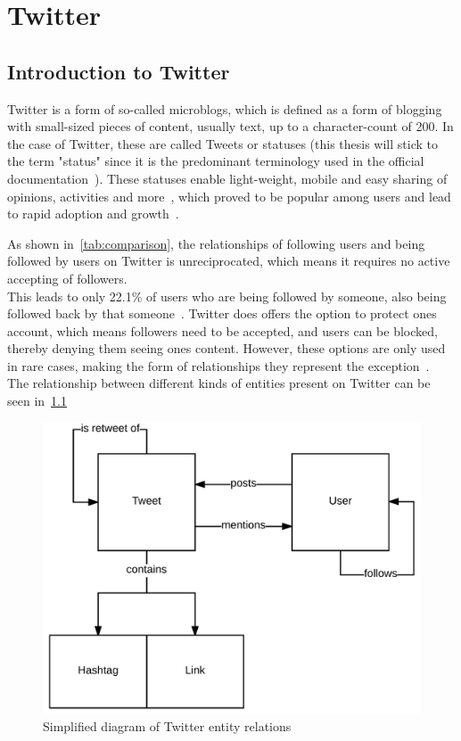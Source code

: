 \chapter{Twitter}
\label{ch:twitter}

\section{Introduction to Twitter}
\label{sec:twitter}

Twitter is a form of so-called microblogs, which is defined as a form of blogging with small-sized pieces of content,
usually text, up to a character-count of 200.
In the case of Twitter, these are called Tweets or statuses
(this thesis will stick to the term "status" since it is the predominant terminology used in the official documentation~\cite{twitterDocs}).
These statuses enable light-weight, mobile and easy sharing of opinions, activities and more~\cite{Finin2007},
which proved to be popular among users and lead to rapid adoption and growth~\cite{mcgiboney2009twitter}.

As shown in~\cref{tab:comparison}, the relationships of following users and being followed by users on Twitter is unreciprocated,
which means it requires no active accepting of followers.\\
This leads to only 22.1\% of users who are being followed by someone, also being followed back by that someone~\cite{Kwak2010}.
Twitter does offers the option to protect ones account, which means followers need to be accepted,
and users can be blocked, thereby denying them seeing ones content.
However, these options are only used in rare cases, making the form of relationships they represent the exception~\cite{Kwak2010}.\\
The relationship between different kinds of entities present on Twitter can be seen in~\cref{fig:twitter}

\begin{figure}[htb]
    \caption{Simplified diagram of Twitter entity relations}
    \label{fig:twitter}
    \centering
    \includegraphics[width=\textwidth]{../figures/twitter_er.pdf}
\end{figure}

